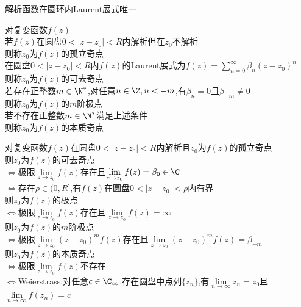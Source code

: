 \begin{tuilun}
解析函数在圆环内Laurent展式唯一
\end{tuilun}

\begin{dingyi}
对复变函数$f(z)$\\
若$f(z)$在圆盘$0<|z-z_0|<R$内解析但在$z_0$不解析\\
则称$z_0$为$f(z)$的孤立奇点\\
在圆盘$0<|z-z_0|<R$内$f(z)$的Laurent展式为$f(z)=\sum\limits_{n=0}^{\infty}\beta_n(z-z_0)^n$\\
则称$z_0$为$f(z)$的可去奇点\\
若存在正整数$m\in\N^*$,对任意$n\in\Z,n<-m$,有$\beta_n=0$且$\beta_{-m}\neq 0$\\
则称$z_0$为$f(z)$的$m$阶极点\\
若不存在正整数$m\in\N^*$满足上述条件\\
则称$z_0$为$f(z)$的本质奇点
\end{dingyi}

\begin{dingli}
对复变函数$f(z)$在圆盘$0<|z-z_0|<R$内解析且$z_0$为$f(z)$的孤立奇点\\
则$z_0$为$f(z)$的可去奇点\\
$\Leftrightarrow$极限$\lim\limits_{z\to z_0}f(z)$存在且$\lim\limits_{z\to z_0}f(z)=\beta_0\in\C$\\
$\Leftrightarrow$存在$\rho\in(0,R]$,有$f(z)$在圆盘$0<|z-z_0|<\rho$内有界\\
则$z_0$为$f(z)$的极点\\
$\Leftrightarrow$极限$\lim\limits_{z\to z_0}f(z)$存在且$\lim\limits_{z\to z_0}f(z)=\infty$\\
则$z_0$为$f(z)$的$m$阶极点\\
$\Leftrightarrow$极限$\lim\limits_{z\to z_0}(z-z_0)^{m}f(z)$存在且$\lim\limits_{z\to z_0}(z-z_0)^{m}f(z)=\beta_{-m}$\\
则$z_0$为$f(z)$的本质奇点\\
$\Leftrightarrow$极限$\lim\limits_{z\to z_0}f(z)$不存在\\
$\Leftrightarrow$Weierstrass:对任意$c\in\C_{\infty}$,存在圆盘中点列$\{z_n\}$,有$\lim\limits_{n\to \infty}z_n=z_0$且$\lim\limits_{n\to\infty}f(z_n)=c$
\end{dingli}

